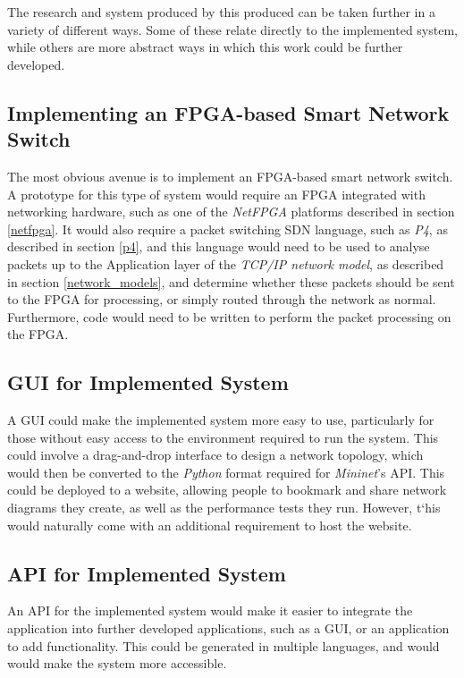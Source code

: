 


%
%
%

The research and system produced by this produced can be taken further in a variety of different ways. Some of these relate directly to the implemented system, while others are more abstract ways in which this work could be further developed.

\subsection{Implementing an FPGA-based Smart Network Switch}
The most obvious avenue is to implement an FPGA-based smart network switch. A prototype for this type of system would require an FPGA integrated with networking hardware, such as one of the \textit{NetFPGA} platforms described in section \ref{netfpga}. It would also require a packet switching SDN language, such as \textit{P4}, as described in section \ref{p4}, and this language would need to be used to analyse packets up to the Application layer of the \textit{TCP/IP network model}, as described in section \ref{network_models}, and determine whether these packets should be sent to the FPGA for processing, or simply routed through the network as normal. Furthermore, code would need to be written to perform the packet processing on the FPGA.

\subsection{GUI for Implemented System}
A GUI could make the implemented system more easy to use, particularly for those without easy access to the environment required to run the system. This could involve a drag-and-drop interface to design a network topology, which would then be converted to the \textit{Python} format required for \textit{Mininet}'s API. This could be deployed to a website, allowing people to bookmark and share network diagrams they create, as well as the performance tests they run. However, t`his would naturally come with an additional requirement to host the website.

\subsection{API for Implemented System}
An API for the implemented system would make it easier to integrate the application into further developed applications, such as a GUI, or an application to add functionality. This could be generated in multiple languages, and would would make the system more accessible.

